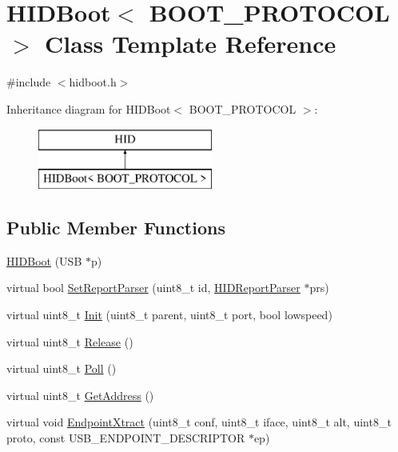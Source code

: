\hypertarget{class_h_i_d_boot}{\section{\-H\-I\-D\-Boot$<$ \-B\-O\-O\-T\-\_\-\-P\-R\-O\-T\-O\-C\-O\-L $>$ \-Class \-Template \-Reference}
\label{class_h_i_d_boot}
}


{\ttfamily \#include $<$hidboot.\-h$>$}

\-Inheritance diagram for \-H\-I\-D\-Boot$<$ \-B\-O\-O\-T\-\_\-\-P\-R\-O\-T\-O\-C\-O\-L $>$\-:\begin{figure}[H]
\begin{center}
\leavevmode
\includegraphics[height=2.000000cm]{class_h_i_d_boot}
\end{center}
\end{figure}
\subsection*{\-Public \-Member \-Functions}
\begin{DoxyCompactItemize}
\item 
\hyperlink{class_h_i_d_boot_a2730c81f6e7ae6aaafa671f55a07620e}{\-H\-I\-D\-Boot} (\-U\-S\-B $\ast$p)
\item 
virtual bool \hyperlink{class_h_i_d_boot_a3e44d340fab7e9eedb357ef61e1c19a5}{\-Set\-Report\-Parser} (uint8\-\_\-t id, \hyperlink{class_h_i_d_report_parser}{\-H\-I\-D\-Report\-Parser} $\ast$prs)
\item 
virtual uint8\-\_\-t \hyperlink{class_h_i_d_boot_aa30d7cf292378153f41d8a13380c6119}{\-Init} (uint8\-\_\-t parent, uint8\-\_\-t port, bool lowspeed)
\item 
virtual uint8\-\_\-t \hyperlink{class_h_i_d_boot_aa21946ce7a4531c036180b5de2941502}{\-Release} ()
\item 
virtual uint8\-\_\-t \hyperlink{class_h_i_d_boot_aa950fe6f7e492c2048f59c98a58ac005}{\-Poll} ()
\item 
virtual uint8\-\_\-t \hyperlink{class_h_i_d_boot_a6fafa2711d72ff4efd6bf91984585aba}{\-Get\-Address} ()
\item 
virtual void \hyperlink{class_h_i_d_boot_a04475d2cd6d8ae19d4e4149714fa4bef}{\-Endpoint\-Xtract} (uint8\-\_\-t conf, uint8\-\_\-t iface, uint8\-\_\-t alt, uint8\-\_\-t proto, const \-U\-S\-B\-\_\-\-E\-N\-D\-P\-O\-I\-N\-T\-\_\-\-D\-E\-S\-C\-R\-I\-P\-T\-O\-R $\ast$ep)
\end{DoxyCompactItemize}


